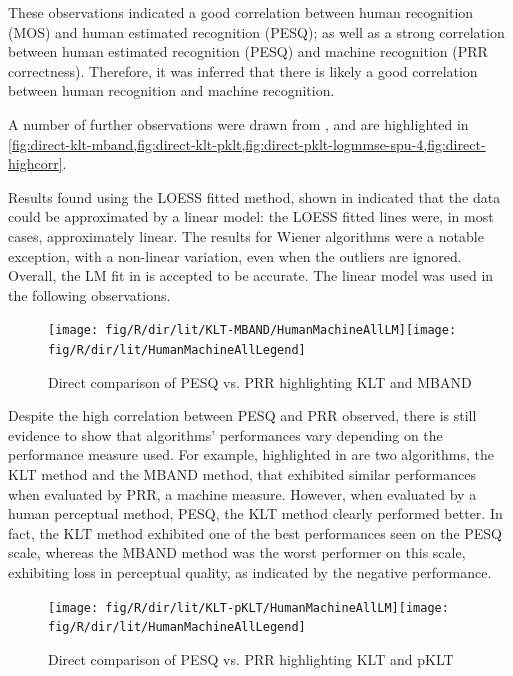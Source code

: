 These observations indicated a good correlation between human recognition
(\ac{MOS}) and human estimated recognition (\ac{PESQ}); as well
as a strong correlation between human estimated recognition (\ac{PESQ})
and machine recognition (\ac{PRR} correctness). Therefore, it was
inferred that there is likely a good correlation between human recognition
and machine recognition.

A number of further observations were drawn from ,
and are highlighted in \cref{fig:direct-klt-mband,fig:direct-klt-pklt,fig:direct-pklt-logmmse-spu-4,fig:direct-highcorr}.

Results found using the \ac{LOESS} fitted method, shown in 
indicated that the data could be approximated by a linear model: the
\ac{LOESS} fitted lines were, in most cases, approximately linear.
The results for Wiener algorithms were a notable exception, with a
non-linear variation, even when the outliers are ignored. Overall,
the \ac{LM} fit in  is accepted to be
accurate. The linear model was used in the following observations.

\begin{figure}[h]
\noindent \begin{centering}
\texttt{[image: fig/R/dir/lit/KLT-MBAND/HumanMachineAllLM]}\texttt{[image: fig/R/dir/lit/HumanMachineAllLegend]}
\par\end{centering}

\protect\caption{\label{fig:direct-klt-mband}Direct comparison of \acs{PESQ} vs.
\acs{PRR} highlighting \acs{KLT} and \acs{MBAND}}
\end{figure}


Despite the high correlation between \ac{PESQ} and \ac{PRR} observed,
there is still evidence to show that algorithms' performances vary
depending on the performance measure used. For example, highlighted
in  are two algorithms, the \ac{KLT} method
and the \ac{MBAND} method, that exhibited similar performances when
evaluated by \ac{PRR}, a machine measure. However, when evaluated
by a human perceptual method, \ac{PESQ}, the \ac{KLT} method clearly
performed better. In fact, the \ac{KLT} method exhibited one of the
best performances seen on the \ac{PESQ} scale, whereas the \ac{MBAND}
method was the worst performer on this scale, exhibiting loss in perceptual
quality, as indicated by the negative performance.

\begin{figure}[h]
\noindent \begin{centering}
\texttt{[image: fig/R/dir/lit/KLT-pKLT/HumanMachineAllLM]}\texttt{[image: fig/R/dir/lit/HumanMachineAllLegend]}
\par\end{centering}

\protect\caption{\label{fig:direct-klt-pklt}Direct comparison of \acs{PESQ} vs. \acs{PRR}
highlighting \acs{KLT} and \acs{pKLT}}
\end{figure}


